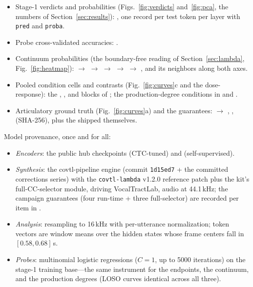 \documentclass[11pt,a4paper]{article}
\newcommand{\sampa}[1]{\texttt{#1}}
\begin{document}
\begin{itemize}[leftmargin=1.4em, itemsep=2pt]
\item Stage-1 verdicts and probabilities
(Figs.~\ref{fig:verdicts} and~\ref{fig:pca}, the numbers of
Section~\ref{sec:results}):
, one record per test
token per layer with \sampa{pred} and \sampa{proba}.
\item Probe cross-validated accuracies:
.
\item Continuum probabilities (the boundary-free reading of
Section~\ref{sec:lambda}, Fig.~\ref{fig:heatmap}):
 $\to$  $\to$
 $\to$  $\to$  $\to$
, and its neighbors along both axes.
\item Pooled condition cells and contrasts
(Fig.~\ref{fig:curves}c and the dose-response): the ,
, and  blocks of
; the production-degree conditions
in  and
.
\item Articulatory ground truth (Fig.~\ref{fig:curves}a) and the
guarantees:
 $\to$
, , 
(SHA-256), plus the shipped  themselves.
\end{itemize}

Model provenance, once and for all:
\begin{itemize}[leftmargin=1.4em, itemsep=2pt]
\item \emph{Encoders}: the public hub checkpoints
 (CTC-tuned) and
 (self-supervised).
\item \emph{Synthesis}: the covtl-pipeline engine (commit
\texttt{1d15ed7} + the committed corrections series) with the
\texttt{covtl-lambda} v1.2.0 reference patch plus the kit's
full-CC-selector module, driving VocalTractLab,
audio at 44.1\,kHz; the campaign guarantees (four run-time + three
full-selector) are recorded per item in
.
\item \emph{Analysis}: resampling to 16\,kHz with per-utterance
normalization; token vectors are window means over the hidden states
whose frame centers fall in $[0.58,0.68]$\,s.
\item \emph{Probes}: multinomial logistic regressions ($C{=}1$, up to
5000 iterations) on the stage-1 training base---the same instrument
for the endpoints, the continuum, and the production degrees (LOSO
curves identical across all three).
\end{itemize}
\end{document}
